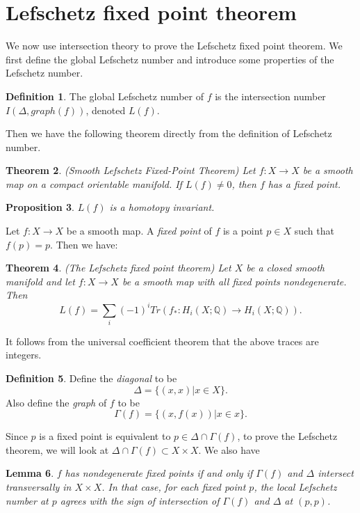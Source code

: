 \documentclass[psamsfonts]{amsart}
\newtheorem{theorem}{Theorem}[section]
\newtheorem{prop}[theorem]{Proposition}
\newtheorem{lem}[theorem]{Lemma}
\theoremstyle{definition}
\newtheorem{defn}[theorem]{Definition}
\theoremstyle{remark}
\numberwithin{equation}{section}
\begin{document}
	\section{Lefschetz fixed point theorem}
		We now use intersection theory to prove the Lefschetz fixed point theorem. We first define the global Lefschetz number and introduce some properties of the Lefschetz number.
	\begin{defn}
			The global Lefschetz number of $f$ is the intersection number $I(\Delta, graph(f))$, denoted $L(f)$.
		\end{defn}	
		Then we have the following theorem directly from the definition of Lefschetz number.
		\begin{theorem}(Smooth Lefschetz Fixed-Point Theorem)
			Let $f:X \to X$ be a smooth map on a compact orientable manifold. If $L(f) \neq 0$, then $f$ has a fixed point.			
		\end{theorem}	
		\begin{prop}
			$L(f)$ is a homotopy invariant.
		\end{prop}	
		\indent Let $f: X \to X$ be a smooth map. A \textit{fixed point} of $f$ is a point $p \in X$ such that $f(p) = p$. Then we have:
		\begin{theorem}(The Lefschetz fixed point theorem)
			Let $X$ be a closed smooth manifold and let $f: X \to X$ be a smooth map with all fixed points nondegenerate. Then
			\begin{equation}
				L(f) = \sum_{i} (-1)^i Tr(f_*: H_i(X;\mathbb{Q}) \to H_i(X;\mathbb{Q})).
			\end{equation}
		\end{theorem}
		It follows from the universal coefficient theorem that the above traces are integers.
		\begin{defn}
			Define the \textit{diagonal} to be
			\begin{equation}
				\Delta = \{(x,x) | x\in X \}.
			\end{equation}
			Also define the \textit{graph} of $f$ to be
			\begin{equation}
				\Gamma (f) = \{ (x,f(x)) | x\in x \}.
			\end{equation}
		\end{defn}
		Since $p$ is a fixed point is equivalent to  $p \in \Delta \cap \Gamma (f)$, to prove the Lefschetz theorem, we will look at $\Delta \cap \Gamma (f) \subset X \times X$. We also have
		\begin{lem}
			$f$ has nondegenerate fixed points if and only if $\Gamma(f)$ and $\Delta$ intersect transversally in $X \times X$. In that case, for each fixed point $p$, the local Lefschetz number at $p$ agrees with the sign of intersection of $\Gamma (f)$ and $\Delta$ at $(p,p)$.
		\end{lem}
\end{document}
